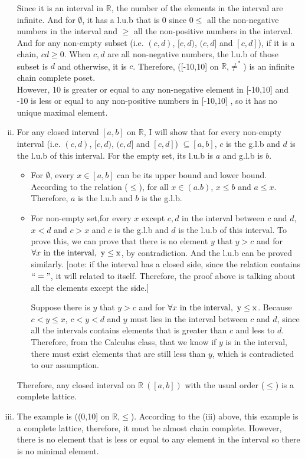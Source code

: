 \documentclass{article}[12pt]
\begin{document}
\begin{enumerate}[(i)]
Since it is an interval in $\mathbb{R}$, the number of the elements in the interval are infinite. And for $\emptyset$, it has a l.u.b that is 0 since $0\leq$ all the non-negative numbers in the interval and $\geq$ all the non-positive numbers in the interval. And for any non-empty subset (i.e. $(c,d)$, $[c,d)$, $(c,d]$ and $[c,d]$), if it is a chain, $cd\geq 0$. When $c,d$ are all non-negative numbers, the l.u.b of those subset is $d$ and otherwise, it is $c$. Therefore, ([-10,10] on $\mathbb{R}$,$ \not=^* $) is an infinite chain complete poset.\\
However, 10 is greater or equal to any non-negative element in [-10,10] and -10 is less or equal to any non-positive numbers in [-10,10] , so it has no unique maximal element.
\item For any closed interval $[a,b]$ on $\mathbb{R}$, I will show that for every non-empty interval (i.e. $(c,d)$, $[c,d)$, $(c,d]$ and $[c,d]$) $\subseteq [a,b]$, $c$ is the g.l.b and $d$ is the l.u.b of this interval. For the empty set, its l.u.b is $a$ and g.l.b is $b$.
\begin{itemize}
\item For $\emptyset$, every $x\in [a,b]$ can be its upper bound and lower bound. According to the relation ($\leq$), for all $x\in (a.b)$, $x\leq b$ and $a\leq x$. Therefore, $a$ is the l.u.b and $b$ is the g.l.b.
\item For non-empty set,for every $x$ except $c,d$ in the interval between $c$ and $d$, $x< d$ and $c> x$ and $c$ is the g.l.b and $d$ is the l.u.b of this interval. To prove this, we can prove that there is no element $y$ that $y> c$ and for $\forall x\rm{\ in\ the\ interval},\ y\leq x$, by contradiction. And the l.u.b can be proved similarly. [note: if the interval has a closed side, since the relation contains $``="$, it will related to itself. Therefore, the proof above is talking about all the elements except the side.]
\par Suppose there is $y$ that $y> c$ and for $\forall x\rm{\ in\ the\ interval},\ y\leq x$. Because $c< y \leq x$, $c< y < d$ and $y$ must lies in the interval between $c$ and $d$, since all the intervals contains elements that is greater than $c$ and less to $d$. Therefore, from the Calculus class, that we know if $y$ is in the interval, there must exist elements that are still less than $y$, which is contradicted to our assumption.
\end{itemize}
Therefore, any closed interval on $\mathbb{R}\ ([a, b])$ with the usual order ($\leq$) is a complete lattice.
\item The example is ((0,10] on $\mathbb{R}$,$ \leq $). According to the (iii) above, this example is a complete lattice, therefore, it must be almost chain complete. However, there is no element that is less or equal to any element in the interval so there is no minimal element.
\end{enumerate}
\end{document}

